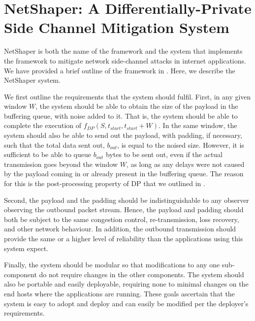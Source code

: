 \chapter{NetShaper: A Differentially-Private Side Channel Mitigation System}
\label{ch:netshaper}

NetShaper \cite{sabzi2024netshaper} is both the name of the framework and the system that implements the framework to mitigate network side-channel attacks in internet applications.
We have provided a brief outline of the framework in . 
Here, we describe the NetShaper system.

We first outline the requirements that the system should fulfil.
First, in any given window $W$, the system should be able to obtain the size of the payload in the buffering queue, with noise added to it. 
That is, the system should be able to complete the execution of $f_{DP}(S, t_{start}, t_{start} + W)$.
In the same window, the system should also be able to send out the payload, with padding, if necessary, such that the total data sent out, $b_{out}$, is equal to the noised size. 
However, it is sufficient to be able to queue $b_{out}$ bytes to be sent out, even if the actual transmission goes beyond the window $W$, as long as any delays were not caused by the payload coming in or already present in the buffering queue. 
The reason for this is the post-processing property of DP that we outlined in .

Second, the payload and the padding should be indistinguishable to any observer observing the outbound packet stream.
Hence, the payload and padding should both be subject to the same congestion control, re-transmission, loss recovery, and other network behaviour.
In addition, the outbound transmission should provide the same or a higher level of reliability than the applications using this system expect.

Finally, the system should be modular so that modifications to any one sub-component do not require changes in the other components.
The system should also be portable and easily deployable, requiring none to minimal changes on the end hosts where the applications are running.
These goals ascertain that the system is easy to adopt and deploy and can easily be modified per the deployer's requirements.













\endinput